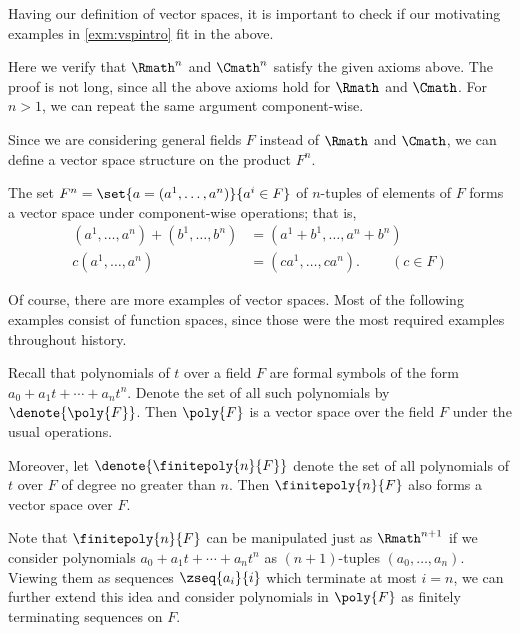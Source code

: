 Having our definition of vector spaces,
it is important to check if
our motivating examples in \cref{exm:vspintro} fit in the above.

\begin{example}
    \label{exm:vsintroverif}
    Here we verify that
    \(\Rmath^n\) and \(\Cmath^n\) satisfy the given axioms above.
    The proof is not long,
    since all the above axioms hold for \(\Rmath\) and \(\Cmath\).
    For \(n>1\), we can repeat the same argument component-wise.
\end{example}

Since we are considering general fields \(F\)
instead of \(\Rmath\) and \(\Cmath\),
we can define a vector space structure on the product \(F^n\).

\begin{definition}
    \label{def:Fn}
    The set \(F^n=\set{a=(a^1,\dots,a^n)}{a^i\in F}\)
    of \(n\)-tuples of elements of \(F\)
    forms a vector space under component-wise operations;
    that is,
    \begin{align*}
        (a^1,\dots,a^n)+(b^1,\dots,b^n)
        &=(a^1+b^1,\dots,a^n+b^n) \\
        c(a^1,\dots,a^n)
        &=(ca^1,\dots,ca^n).
        \qquad\ (c\in F)
    \end{align*}
\end{definition}

Of course, there are more examples of vector spaces.
Most of the following examples consist of function spaces,
since those were the most required examples throughout history.

\begin{example}[Polynomials]
    \label{exm:vsppoly}
    Recall that polynomials of \(t\) over a field \(F\)
    are formal symbols of the form \(a_0+a_1t+\cdots+a_nt^n\).
    Denote the set of all such polynomials by \(\denote{\poly{F}}\).
    Then \(\poly{F}\) is a vector space over the field \(F\)
    under the usual operations.

    Moreover, let \(\denote{\finitepoly{n}{F}}\)
    denote the set of all polynomials of \(t\) over \(F\)
    of degree no greater than \(n\).
    Then \(\finitepoly{n}{F}\) also forms a vector space over \(F\).
\end{example}

Note that
\(\finitepoly{n}{F}\) can be manipulated just as \(\Rmath^{n+1}\)
if we consider polynomials \(a_0+a_1t+\cdots+a_nt^n\)
as \((n+1)\)-tuples \((a_0,\dots,a_n)\).
Viewing them as sequences \(\zseq{a_i}{i}\)
which terminate at most \(i=n\),
we can further extend this idea
and consider polynomials in \(\poly{F}\)
as finitely terminating sequences on \(F\).

